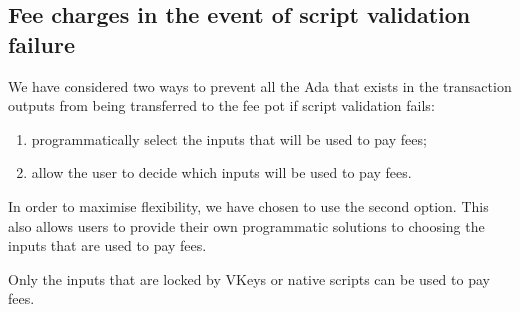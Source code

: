 \subsection{Fee charges in the event of script validation failure}

We have considered two ways to prevent all the Ada that exists in the transaction outputs from being transferred to
the fee pot if script validation fails:
%
\begin{enumerate}
  \item programmatically select the inputs that will be used to pay fees;
  \item allow the user to decide which inputs will be used to pay fees.
\end{enumerate}
%
In order to maximise flexibility, we have chosen to use the second option.
This also allows users to provide their own programmatic solutions to choosing the inputs that are used to pay fees.

Only the inputs that are locked by VKeys or native scripts can
be used to pay fees.
